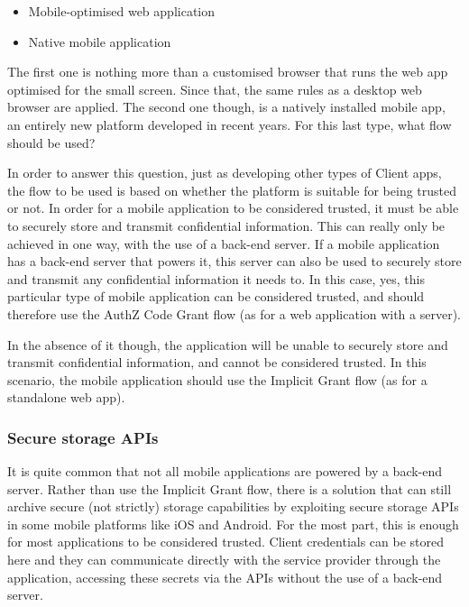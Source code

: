\documentclass[a4paper,12pt]{article}
\begin{document}
\begin{itemize}
    \item Mobile-optimised web application
    \item Native mobile application
\end{itemize}

The first one is nothing more than a customised browser that runs the web app optimised for the small screen. Since that, the same rules as a desktop web browser are applied.
The second one though, is a natively installed mobile app, an entirely new platform developed in recent years. For this last type, what flow should be used? 

In order to answer this question, just as developing other types of Client apps, the flow to be used is based on whether the platform is suitable for being trusted or not. In order for a mobile application to be considered trusted, it must be able to securely store and transmit confidential information. This can really only be achieved in
one way, with the use of a back-end server. If a mobile application has a back-end server that powers it, this server can also be used to securely store and transmit any confidential information it needs to. In this case, yes, this particular type of mobile application can be considered trusted, and should therefore use the AuthZ Code Grant flow (as for a web application with a server). 

In the absence of it though, the application will be unable to securely store and transmit confidential information, and cannot be considered trusted. In this scenario, the mobile application should use the Implicit Grant flow (as for a standalone web app).

\subsubsection{Secure storage APIs}
It is quite common that not all mobile applications are powered by a back-end server. Rather than use the Implicit Grant flow, there is a solution that can still archive secure (not strictly) storage capabilities by exploiting secure storage APIs in some mobile platforms like iOS and Android.  For the most part, this is enough for most applications to be considered trusted. Client credentials can be stored here and they can communicate directly with the service provider through the application, accessing these secrets via the APIs without the use of a back-end server.
\end{document}
